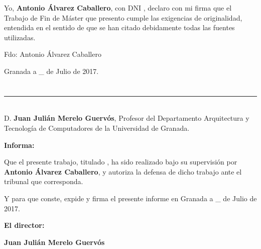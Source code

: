 Yo, \textbf{Antonio Álvarez Caballero}, con DNI \dni, declaro con mi firma que
el Trabajo de Fin de Máster que presento cumple las exigencias de originalidad,
entendida en el sentido de que se han citado debidamente todas las fuentes
utilizadas.

\vspace{6cm}

\noindent Fdo: Antonio Álvarez Caballero

\vspace{2cm}

\begin{flushright}
Granada a \_ de Julio de 2017.
\end{flushright}


\chapter*{}
\thispagestyle{empty}

\noindent\rule[-1ex]{\textwidth}{2pt}\\[4.5ex]

D. \textbf{Juan Julián Merelo Guervós}, Profesor del Departamento Arquitectura y Tecnología de Computadores de la Universidad de Granada.

\vspace{0.5cm}

\textbf{Informa:}

\vspace{0.5cm}

Que el presente trabajo, titulado \textit{\textbf{\titulo}},
ha sido realizado bajo su supervisión por \textbf{Antonio Álvarez Caballero}, y autoriza la defensa de dicho trabajo ante el tribunal
que corresponda.

\vspace{0.5cm}

Y para que conste, expide y firma el presente informe en Granada a \_ de Julio de 2017.

\vspace{1cm}

\textbf{El director:}

\vspace{5cm}

\noindent \textbf{Juan Julián Merelo Guervós}

%
%
%
%
%
%
